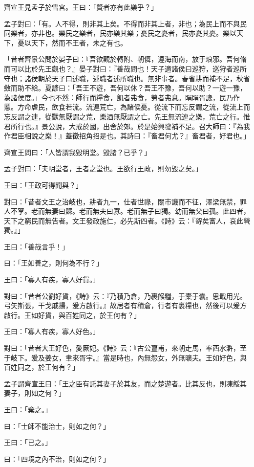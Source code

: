 \begin{pinyinscope}
齊宣王見孟子於雪宮。王曰：「賢者亦有此樂乎？」

孟子對曰：「有。人不得，則非其上矣。不得而非其上者，非也；為民上而不與民同樂者，亦非也。樂民之樂者，民亦樂其樂；憂民之憂者，民亦憂其憂。樂以天下，憂以天下，然而不王者，未之有也。

「昔者齊景公問於晏子曰：『吾欲觀於轉附、朝儛，遵海而南，放于琅邪。吾何脩而可以比於先王觀也？』晏子對曰：『善哉問也！天子適諸侯曰巡狩，巡狩者巡所守也；諸侯朝於天子曰述職，述職者述所職也。無非事者。春省耕而補不足，秋省斂而助不給。夏諺曰：「吾王不遊，吾何以休？吾王不豫，吾何以助？一遊一豫，為諸侯度。」今也不然：師行而糧食，飢者弗食，勞者弗息。睊睊胥讒，民乃作慝。方命虐民，飲食若流。流連荒亡，為諸侯憂。從流下而忘反謂之流，從流上而忘反謂之連，從獸無厭謂之荒，樂酒無厭謂之亡。先王無流連之樂，荒亡之行。惟君所行也。』景公說，大戒於國，出舍於郊。於是始興發補不足。召大師曰：『為我作君臣相說之樂！』蓋徵招角招是也。其詩曰：『畜君何尤？』畜君者，好君也。」

齊宣王問曰：「人皆謂我毀明堂。毀諸？已乎？」

孟子對曰：「夫明堂者，王者之堂也。王欲行王政，則勿毀之矣。」

王曰：「王政可得聞與？」

對曰：「昔者文王之治岐也，耕者九一，仕者世祿，關市譏而不征，澤梁無禁，罪人不孥。老而無妻曰鰥。老而無夫曰寡。老而無子曰獨。幼而無父曰孤。此四者，天下之窮民而無告者。文王發政施仁，必先斯四者。《詩》云：『哿矣富人，哀此煢獨。』」

王曰：「善哉言乎！」

曰：「王如善之，則何為不行？」

王曰：「寡人有疾，寡人好貨。」

對曰：「昔者公劉好貨，《詩》云：『乃積乃倉，乃裹餱糧，于橐于囊。思戢用光。弓矢斯張，干戈戚揚，爰方啟行。』故居者有積倉，行者有裹糧也，然後可以爰方啟行。王如好貨，與百姓同之，於王何有？」

王曰：「寡人有疾，寡人好色。」

對曰：「昔者大王好色，愛厥妃。《詩》云：『古公亶甫，來朝走馬，率西水滸，至于岐下。爰及姜女，聿來胥宇。』當是時也，內無怨女，外無曠夫。王如好色，與百姓同之，於王何有？」

孟子謂齊宣王曰：「王之臣有託其妻子於其友，而之楚遊者。比其反也，則凍餒其妻子，則如之何？」

王曰：「棄之。」

曰：「士師不能治士，則如之何？」

王曰：「已之。」

曰：「四境之內不治，則如之何？」


\end{pinyinscope}
